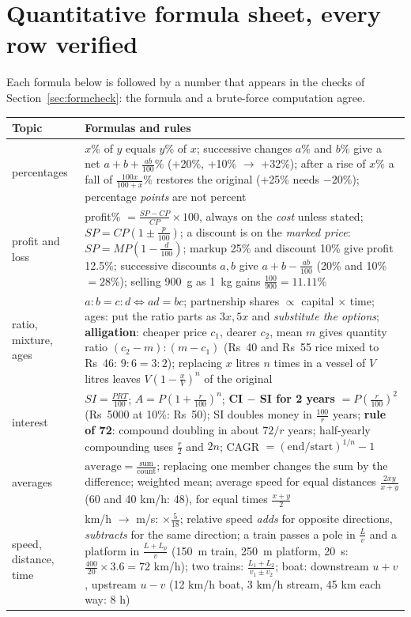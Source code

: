 \documentclass[10pt,a4paper,openany,oneside]{report}
\newcommand{\prio}[1]{\texorpdfstring{\ifcase#1\or{\color{gold}\ding{72}}\or{\color{gold}\ding{72}\ding{72}}\or{\color{gold}\ding{72}\ding{72}\ding{72}}\fi}{}}
\begin{document}
\section{Quantitative formula sheet, every row verified \prio{3}}
Each formula below is followed by a number that appears in the checks of Section~\ref{sec:formcheck}: the formula and a brute-force computation agree.
\begin{center}\small
\begin{xltabular}{\textwidth}{@{}L{2.9cm}Y@{}}
\toprule
\textbf{Topic} & \textbf{Formulas and rules}\\
\midrule\endhead
percentages & $x\%$ of $y$ equals $y\%$ of $x$; successive changes $a\%$ and $b\%$ give a net $a+b+\frac{ab}{100}\%$ (+20\%, +10\% $\to$ +32\%); after a rise of $x\%$ a fall of $\frac{100x}{100+x}\%$ restores the original (+25\% needs $-20\%$); percentage \emph{points} are not percent\\
profit and loss & profit\% $=\frac{SP-CP}{CP}\times100$, always on the \emph{cost} unless stated; $SP=CP(1\pm\frac p{100})$; a discount is on the \emph{marked price}: $SP=MP(1-\frac d{100})$; markup 25\% and discount 10\% give profit 12.5\%; successive discounts $a,b$ give $a+b-\frac{ab}{100}$ (20\% and 10\% $=28\%$); selling 900~g as 1~kg gains $\frac{100}{900}=11.11\%$\\
ratio, mixture, ages & $a:b=c:d\iff ad=bc$; partnership shares $\propto$ capital $\times$ time; ages: put the ratio parts as $3x,5x$ and \emph{substitute the options}; \textbf{alligation}: cheaper price $c_1$, dearer $c_2$, mean $m$ gives quantity ratio $(c_2-m):(m-c_1)$ (Rs~40 and Rs~55 rice mixed to Rs~46: $9:6=3:2$); replacing $x$ litres $n$ times in a vessel of $V$ litres leaves $V(1-\frac xV)^n$ of the original\\
interest & $SI=\frac{PRT}{100}$; $A=P(1+\frac r{100})^n$; \textbf{CI $-$ SI for 2 years} $=P(\frac r{100})^2$ (Rs~5000 at 10\%: Rs~50); SI doubles money in $\frac{100}r$ years; \textbf{rule of 72}: compound doubling in about $72/r$ years; half-yearly compounding uses $\frac r2$ and $2n$; CAGR $=(\text{end}/\text{start})^{1/n}-1$\\
averages & $\text{average}=\frac{\text{sum}}{\text{count}}$; replacing one member changes the sum by the difference; weighted mean; average speed for equal distances $\frac{2xy}{x+y}$ (60 and 40 km/h: 48), for equal times $\frac{x+y}2$\\
speed, distance, time & km/h $\to$ m/s: $\times\frac5{18}$; relative speed \emph{adds} for opposite directions, \emph{subtracts} for the same direction; a train passes a pole in $\frac{L}{v}$ and a platform in $\frac{L+L_p}{v}$ (150~m train, 250~m platform, 20~s: $\frac{400}{20}\times3.6=72$ km/h); two trains: $\frac{L_1+L_2}{v_1\pm v_2}$; boat: downstream $u+v$, upstream $u-v$ (12 km/h boat, 3 km/h stream, 45 km each way: 8 h)\\

\end{xltabular}
\end{center}
\end{document}
